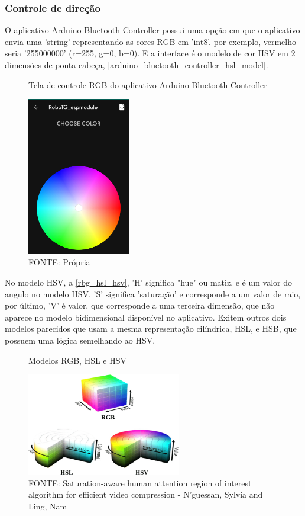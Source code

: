 \subsubsection{Controle de direção}

O aplicativo Arduino Bluetooth Controller possui uma opção em que o aplicativo envia uma
'string' representando as cores RGB em 'int8'.
por exemplo,  vermelho seria '255000000' (r=255, g=0, b=0).
E a interface é o modelo de cor HSV em 2 dimensões de ponta cabeça,
\autoref{arduino_bluetooth_controller_hsl_model}.


\begin{figure}[htb]
	\centering
	\caption{Tela de controle RGB do aplicativo Arduino Bluetooth Controller}
	\includegraphics[width=0.40\textwidth]{figures/andriod_bluetooth_controller_hsl_model}
    \caption*{FONTE: Própria}
	\label{arduino_bluetooth_controller_hsl_model}
\end{figure}

No modelo HSV,  a \autoref{rbg_hsl_hsv}, 'H' significa "hue" ou matiz, e é 
um valor do angulo no modelo HSV, 'S' significa 'saturação' e corresponde a um valor de raio,
por último, 'V' é valor, que corresponde a uma terceira dimensão, 
que não aparece no modelo bidimensional disponível no aplicativo.
Exitem outros dois modelos parecidos que usam a mesma representação cilíndrica, 
HSL, e HSB, que possuem uma lógica semelhando ao HSV.


\begin{figure}[htb]
	\centering
	\caption{Modelos RGB, HSL e HSV}
	\includegraphics[width=0.6\textwidth]{figures/RBG_HSL_HSV}
	\caption*{
        FONTE: Saturation-aware human attention region of interest algorithm for
        efficient video compression - N'guessan, Sylvia and Ling, Nam \cite{rbg_hsl_hsv}
    }
	\label{rbg_hsl_hsv}
\end{figure}

